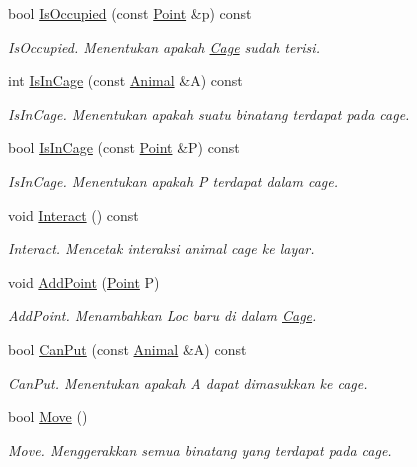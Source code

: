 \begin{DoxyCompactItemize}
bool \hyperlink{classCage_a176fc9feeb9855881e85c5d8551a6443}{Is\+Occupied} (const \hyperlink{classPoint}{Point} \&p) const 
\begin{DoxyCompactList}\small\item\em Is\+Occupied. Menentukan apakah \hyperlink{classCage}{Cage} sudah terisi. \end{DoxyCompactList}\item 
int \hyperlink{classCage_aaf098729df55f3cf45068d32fe6d5c4b}{Is\+In\+Cage} (const \hyperlink{classAnimal}{Animal} \&A) const 
\begin{DoxyCompactList}\small\item\em Is\+In\+Cage. Menentukan apakah suatu binatang terdapat pada cage. \end{DoxyCompactList}\item 
bool \hyperlink{classCage_a2ac9ea442655213ae3d52a6a7dc30fcf}{Is\+In\+Cage} (const \hyperlink{classPoint}{Point} \&P) const 
\begin{DoxyCompactList}\small\item\em Is\+In\+Cage. Menentukan apakah P terdapat dalam cage. \end{DoxyCompactList}\item 
void \hyperlink{classCage_a78f919dc2b8a3e89a7375c97643a2633}{Interact} () const 
\begin{DoxyCompactList}\small\item\em Interact. Mencetak interaksi animal cage ke layar. \end{DoxyCompactList}\item 
void \hyperlink{classCage_aed8ca487fb22db2ca755bc9d784342fc}{Add\+Point} (\hyperlink{classPoint}{Point} P)
\begin{DoxyCompactList}\small\item\em Add\+Point. Menambahkan Loc baru di dalam \hyperlink{classCage}{Cage}. \end{DoxyCompactList}\item 
bool \hyperlink{classCage_aece0c17d0299b55c596eb68175df71a8}{Can\+Put} (const \hyperlink{classAnimal}{Animal} \&A) const 
\begin{DoxyCompactList}\small\item\em Can\+Put. Menentukan apakah A dapat dimasukkan ke cage. \end{DoxyCompactList}\item 
bool \hyperlink{classCage_a973611397e576888027012237486cd25}{Move} ()
\begin{DoxyCompactList}\small\item\em Move. Menggerakkan semua binatang yang terdapat pada cage. \end{DoxyCompactList}\end{DoxyCompactItemize}


